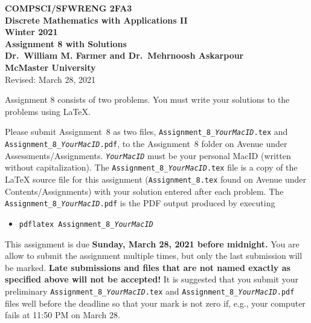 \documentclass[11pt,fleqn]{article}
\begin{document}
	
	\begin{center}
		
		{\large \textbf{COMPSCI/SFWRENG 2FA3}}\\[2mm]
		{\large \textbf{Discrete Mathematics with Applications II}}\\[2mm]
		{\large \textbf{Winter 2021}}\\[8mm]
		{\huge \textbf{Assignment 8 with Solutions}}\\[6mm]
		{\large \textbf{Dr.~William M. Farmer and Dr.~Mehrnoosh Askarpour}}\\[2mm]
		{\large \textbf{McMaster University}}\\[6mm]
		{\large Revised: March 28, 2021}
		
	\end{center}
	
	\medskip
	
	Assignment 8 consists of two problems.  You must write your solutions
	to the problems using LaTeX.
	
	Please submit Assignment~8 as two files,
	\texttt{Assignment\_8\_\emph{YourMacID}.tex} and
	\texttt{Assignment\_8\_\emph{YourMacID}.pdf}, to the Assignment~8
	folder on Avenue under Assessments/Assignments.
	\texttt{\emph{YourMacID}} must be your personal MacID (written without
	capitalization).  The \texttt{Assignment\_8\_\emph{YourMacID}.tex}
	file is a copy of the LaTeX source file for this assignment
	(\texttt{Assignment\_8.tex} found on Avenue under
	Contents/Assignments) with your solution entered after each problem.
	The \texttt{Assignment\_8\_\emph{YourMacID}.pdf} is the PDF output
	produced by executing
	
	\begin{itemize}
		
		\item[] \texttt{pdflatex Assignment\_8\_\emph{YourMacID}}
		
	\end{itemize}
	
	This assignment is due \textbf{Sunday, March 28, 2021 before
		midnight.}  You are allow to submit the assignment multiple times,
	but only the last submission will be marked.  \textbf{Late submissions
		and files that are not named exactly as specified above will not be
		accepted!}  It is suggested that you submit your preliminary
	\texttt{Assignment\_8\_\emph{YourMacID}.tex} and
	\texttt{Assignment\_8\_\emph{YourMacID}.pdf} files well before the
	deadline so that your mark is not zero if, e.g., your computer fails
	at 11:50 PM on March 28.
	
\end{document}
